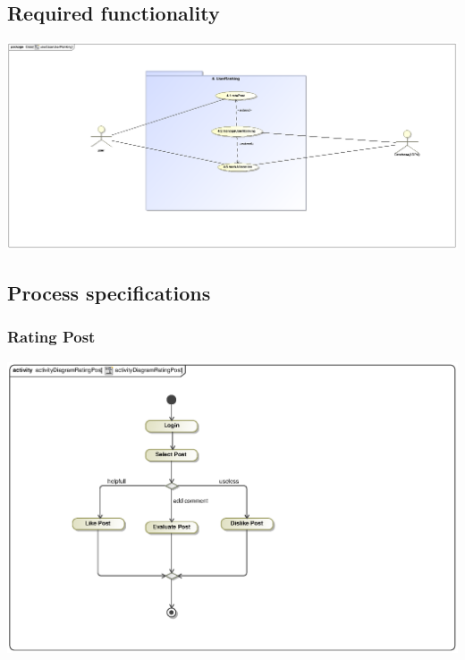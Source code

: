 \documentclass[hidelinks, 12pt, oneside]{article}
\begin{document}
\subsection{Required functionality} 
\includegraphics[scale=.9]{Kgomotso/graphics/useCaseUserRanking.eps}\\

\subsection{Process specifications}
\subsubsection{Rating Post}
\includegraphics[scale=.9]{Kgomotso/graphics/activityDiagramRatingPost.eps}\\
\end{document}
